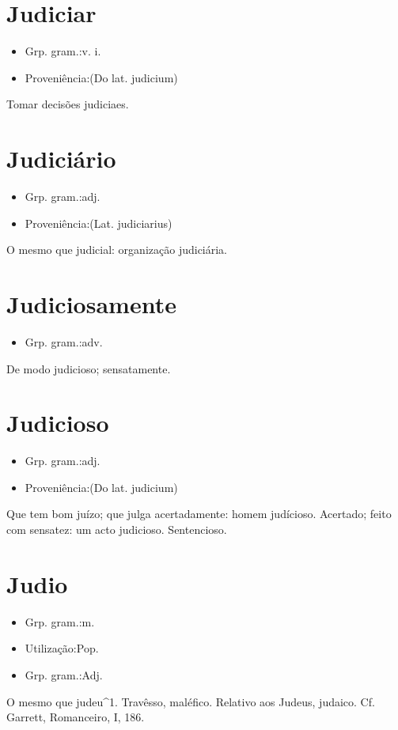 \documentclass{article}
\begin{document}
\section{Judiciar}
\begin{itemize}
\item {Grp. gram.:v. i.}
\end{itemize}
\begin{itemize}
\item {Proveniência:(Do lat. \textunderscore judicium\textunderscore )}
\end{itemize}
Tomar decisões judiciaes.
\section{Judiciário}
\begin{itemize}
\item {Grp. gram.:adj.}
\end{itemize}
\begin{itemize}
\item {Proveniência:(Lat. \textunderscore judiciarius\textunderscore )}
\end{itemize}
O mesmo que \textunderscore judicial\textunderscore : \textunderscore organização judiciária\textunderscore .
\section{Judiciosamente}
\begin{itemize}
\item {Grp. gram.:adv.}
\end{itemize}
De modo judicioso; sensatamente.
\section{Judicioso}
\begin{itemize}
\item {Grp. gram.:adj.}
\end{itemize}
\begin{itemize}
\item {Proveniência:(Do lat. \textunderscore judicium\textunderscore )}
\end{itemize}
Que tem bom juízo; que julga acertadamente: \textunderscore homem judícioso\textunderscore .
Acertado; feito com sensatez: \textunderscore um acto judicioso\textunderscore .
Sentencioso.
\section{Judio}
\begin{itemize}
\item {Grp. gram.:m.}
\end{itemize}
\begin{itemize}
\item {Utilização:Pop.}
\end{itemize}
\begin{itemize}
\item {Grp. gram.:Adj.}
\end{itemize}
O mesmo que \textunderscore judeu\textunderscore ^1.
Travêsso, maléfico.
Relativo aos Judeus, judaico. Cf. Garrett, \textunderscore Romanceiro\textunderscore , I, 186.
\end{document}
